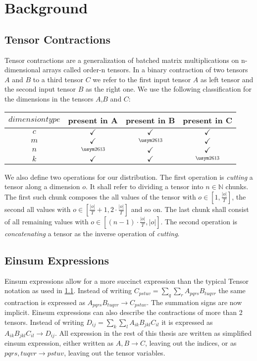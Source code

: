 \section{Background}

\subsection{Tensor Contractions}
\label{sec:tensorContractions}

Tensor contractions are a generalization of batched matrix multiplications on n-dimensional arrays called order-n tensors.
In a binary contraction of two tensors $A$ and $B$ to a third tensor $C$ we refer to the first input tensor $A$ as left tensor and the second input tensor $B$ as the right one.
We use the following classification for the dimensions in the tensors $A$,$B$ and $C$:

\begin{tabular}{ |c|c|c|c| } 
  \hline
  $dimension type$ & present in A & present in B & present in C\\
  \hline
  $c$ & $\checkmark$& $\checkmark$& $\checkmark$\\
  $m$ & $\checkmark$& $\crossmark$& $\checkmark$\\
  $n$ & $\crossmark$& $\checkmark$& $\checkmark$\\
  $k$ & $\checkmark$& $\checkmark$& $\crossmark$\\
  \hline
\end{tabular}

We also define two operations for our distribution.
The first operation is \textit{cutting} a tensor along a dimension $o$.
It shall refer to dividing a tensor into $n \in \mathbb{N}$ chunks.
The first such chunk composes the all values of the tensor with $o \in [1,\frac{|o|}{T}]$, the second all values with $o \in [\frac{|o|}{T}+1, 2 \cdot \frac{|o|}{T}]$ and so on.
The last chunk shall consist of all remaining values with $o \in [(n-1) \cdot \frac{|o|}{T}, |o|]$.
The second operation is \textit{concatenating} a tensor as the inverse operation of \textit{cutting}.


\subsection{Einsum Expressions}
\label{sec:einsum_expr}

Einsum expressions allow for a more succinct expression than the typical Tensor notation as used in \ref{sec:tensorContractions}.
Instead of writing $C_{pstuv}=\sum_{q}\sum_{r}A_{pqrs}B_{tuqvr}$ the same contraction is expressed as $A_{pqrs}B_{tuqvr} \rightarrow C_{pstuv}$.
The summation signs are now implicit.
Einsum expressions can also describe the contractions of more than 2 tensors\cite{einsum_is_all_you_need}.
Instead of writing $D_{ij} = \sum_{k}\sum_{l}A_{ik}B_{jkl}C_{il}$ it is expressed as $A_{ik}B_{jkl}C_{il} \rightarrow D_{ij}$.
All expression in the rest of this thesis are written as simplified einsum expression, either written as $A,B\rightarrow C$, leaving out the indices, or as $pqrs,tuqvr \rightarrow pstuv$, leaving out the tensor variables.

